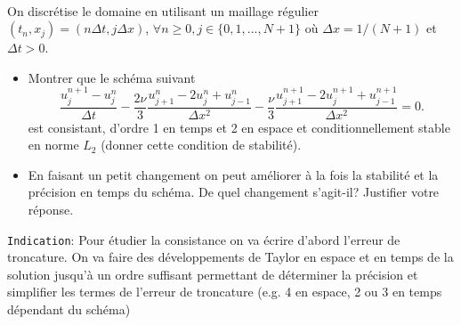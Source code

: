 \documentclass[12pt,a4paper]{article}
\begin{document}
 \\ %

\noindent On discr\'etise le domaine en utilisant un maillage r\'egulier
$(t_n,x_j)=(n\Delta t,j\Delta x)$,  $\forall n\ge 0,j\in\{0,1,...,N+1\}$ o\`u $\Delta x=1/(N+1)$ et $\Delta t>0$. \\

\begin{itemize}
\item Montrer que le sch\'ema suivant
\begin{equation}\label{sch:1}
\frac{u_j^{n+1}-u_j^n}{\Delta t}-\frac{2\nu}{3} \frac{u_{j+1}^{n}-2u_j^n+u_{j-1}^{n}}{\Delta x^2}-\frac{\nu}{3} \frac{u_{j+1}^{n+1}-2u_j^{n+1}+u_{j-1}^{n+1}}{\Delta x^2}=0.
\end{equation}
est consistant, d'ordre 1 en temps et 2 en espace et conditionnellement stable en norme $L_2$ (donner cette condition de stabilité). 

\item En faisant un petit changement on peut améliorer à la fois la stabilité et la précision en temps du schéma. De quel changement s'agit-il? Justifier votre réponse.

\end{itemize}

\noindent \texttt{Indication}: Pour étudier la consistance on va écrire d'abord l'erreur de troncature. On va faire des développements de Taylor en espace et en temps de la solution jusqu'à un ordre suffisant permettant de déterminer la précision et simplifier les termes de l'erreur de troncature (e.g. 4 en espace, 2 ou 3 en temps dépendant du schéma)
\end{document}
